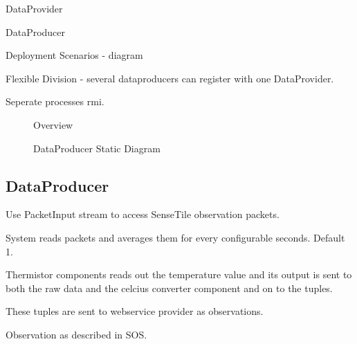 \documentclass[]{final_report}
\begin{document}
DataProvider

DataProducer

Deployment Scenarios - diagram

Flexible Division - several dataproducers can register with one DataProvider.

Seperate processes rmi.
 \begin{figure}
\caption{Overview}\label{fig:SystemOverview.png}
\end{figure}


 \begin{figure}
\caption{DataProducer Static Diagram}\label{fig:sensetile_static_diagam.png}
\end{figure}

\subsection{DataProducer}
Use PacketInput stream to access SenseTile observation packets.

System reads packets and averages them for every configurable seconds. Default 1.

Thermistor components reads out the temperature value
and its output is sent to both the raw data and the celcius
converter component and on to the tuples.

These tuples are sent to webservice provider as observations.

Observation as described in SOS.
\end{document}
